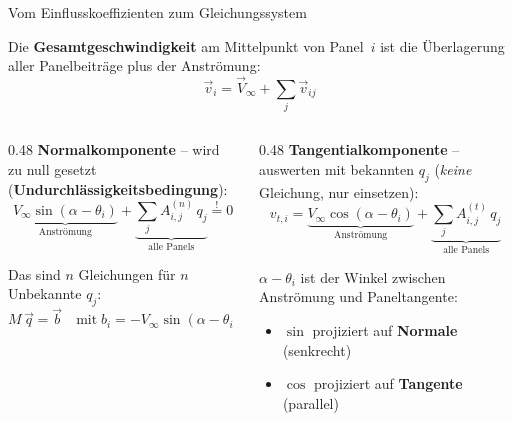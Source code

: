\documentclass[aspectratio=169]{beamer}
\begin{document}
\begin{frame}{Vom Einflusskoeffizienten zum Gleichungssystem}
\footnotesize

Die \textbf{Gesamtgeschwindigkeit} am Mittelpunkt von Panel~$i$ ist die
Überlagerung aller Panelbeiträge plus der Anströmung:
\vspace{-1mm}
\[
  \vec{v}_i = \vec{V}_\infty + \sum_j \vec{v}_{ij}
\]

\vspace{-3mm}
\begin{columns}[T]
\begin{column}{0.48\textwidth}
\textbf{Normalkomponente} -- wird zu null gesetzt
(\textbf{Undurchlässigkeitsbedingung}):
\vspace{-1mm}
\[
  \underbrace{V_\infty\sin(\alpha\!-\!\theta_i)}_{\text{Anströmung}}
  + \underbrace{\sum_j A^{(n)}_{i,j}\,q_j}_{\text{alle Panels}}
  \stackrel{!}{=} 0
\]

\vspace{-2mm}
Das sind $n$ Gleichungen für $n$ Unbekannte $q_j$:
\vspace{-1mm}
\[
  \boxed{M\,\vec{q} = \vec{b}}
  \quad\text{mit}\;
  b_i = -V_\infty\sin(\alpha\!-\!\theta_i)
\]
\end{column}
\begin{column}{0.48\textwidth}
\textbf{Tangentialkomponente} -- auswerten mit
bekannten $q_j$ (\emph{keine} Gleichung, nur einsetzen):
\vspace{-1mm}
\[
  v_{t,i} =
  \underbrace{V_\infty\cos(\alpha\!-\!\theta_i)}_{\text{Anströmung}}
  + \underbrace{\sum_j A^{(t)}_{i,j}\,q_j}_{\text{alle Panels}}
\]

\vspace{-2mm}
$\alpha\!-\!\theta_i$ ist der Winkel zwischen Anströmung
und Paneltangente:
\begin{itemize}\setlength\itemsep{0pt}
  \item $\sin$ projiziert auf \textbf{Normale} (senkrecht)
  \item $\cos$ projiziert auf \textbf{Tangente} (parallel)
\end{itemize}
\end{column}
\end{columns}

\end{frame}
\end{document}
